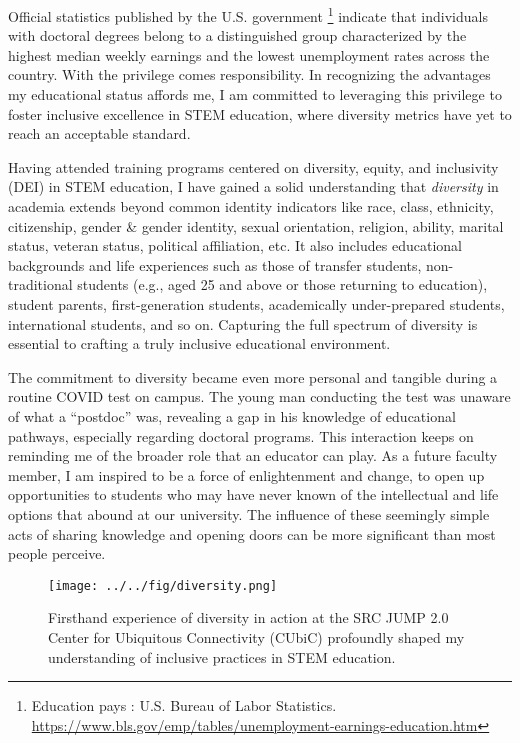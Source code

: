 Official statistics published by the U.S. government%
\footnote{Education pays : U.S. Bureau of Labor Statistics. \url{https://www.bls.gov/emp/tables/unemployment-earnings-education.htm}} indicate that individuals with doctoral degrees belong to a distinguished group characterized by the highest median weekly earnings and the lowest unemployment rates across the country. With the privilege comes responsibility. In recognizing the advantages my educational status affords me, I am committed to leveraging this privilege to foster inclusive excellence in STEM education, where diversity metrics have yet to reach an acceptable standard.

Having attended training programs centered on diversity, equity, and inclusivity (DEI) in STEM education, I have gained a solid understanding that \emph{diversity} in academia extends beyond common identity indicators like race, class, ethnicity, citizenship, gender \& gender identity, sexual orientation, religion, ability, marital status, veteran status, political affiliation, etc. It also includes educational backgrounds and life experiences such as those of transfer students, non-traditional students (e.g., aged 25 and above or those returning to education), student parents, first-generation students, academically under-prepared students, international students, and so on. Capturing the full spectrum of diversity is essential to crafting a truly inclusive educational environment.

The commitment to diversity became even more personal and tangible during a routine COVID test on campus. The young man conducting the test was unaware of what a ``postdoc'' was, revealing a gap in his knowledge of educational pathways, especially regarding doctoral programs. This interaction keeps on reminding me of the broader role that an educator can play. As a future faculty member, I am inspired to be a force of enlightenment and change, to open up opportunities to students who may have never known of the intellectual and life options that abound at our university. The influence of these seemingly simple acts of sharing knowledge and opening doors can be more significant than most people perceive.

\begin{figure}[!ht]%
    \texttt{[image: ../../fig/diversity.png]}
    \caption{Firsthand experience of diversity in action at the SRC JUMP 2.0 Center for Ubiquitous Connectivity (CUbiC) profoundly shaped my understanding of inclusive practices in STEM education.}
    \label{fig:diversity}
\end{figure}


